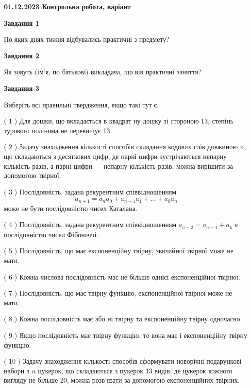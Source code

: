 \documentclass[12pt, ukrainian]{article}
\begin{document}
\begin {large}

\textbf{01.12.2023 Контрольна робота, варіант  }\par


{
{\begin {center}\textbf{Завдання 1}\end {center}}\par
По яких днях тижня відбувались практичні з предмету?\par
{\begin {center}\textbf{Завдання 2}\end {center}}\par
Як зовуть (ім'я, по батькові) викладача, що вів практичні заняття?\par
{\begin {center}\textbf{Завдання 3}\end {center}}\par
Виберіть всі правильні твердження, якщо такі тут є.\par
\vspace{2mm}
( 1 ) Для дошки, що вкладається в квадрат ну дошку зі стороною 13, степінь турового полінома не перевищує 13.%

( 2 ) Задачу знаходження кількості способів складання кодових слів довжиною $n$, що складаються з десяткових цифр, де парні цифри зустрічаються непарну кількість разів, а парні цифри — непарну кількість разів, можна вирішити за допомогою твірної.%

( 3 ) Послідовність, задана рекурентним співвідношенням $$a_{n+1}=a_{n}a_{0}+a_{n-1}a_{1}+\ldots+a_0a_{n}$$ може не бути послідовністю чисел Каталана.%

( 4 ) Послідовність, задана рекурентним співвідношенням $a_{n+2}=a_{n+1}+a_{n}$ є послідовністю чисел Фібоначчі.%

( 5 ) Послідовність, що має експоненційну твірну, звичайної твірної може не мати.%

( 6 ) Кожна числова послідовність має не більше однієї  експоненційної твірної.%

( 7 ) Послідовність, що має твірну функцію, експоненційної твірної може не мати.%

( 8 ) Кожна послідовність має або ні твірну та експоненційну твірну одночасно.%

( 9 ) Якщо послідовність має твірну функцію, то вона має і експоненційну твірну функцію.%

( 10 ) Задачу знаходження кількості способів сформувати новорічні подарункові набори з $n$ цукерок, що складаються з цукерок 13 видів, де цукерок кожного вигляду не більше 20, можна розв’язати за допомогою експоненційних твірних.%
}
\end {large}

\vspace{4mm}
\newpage
\end{document}
